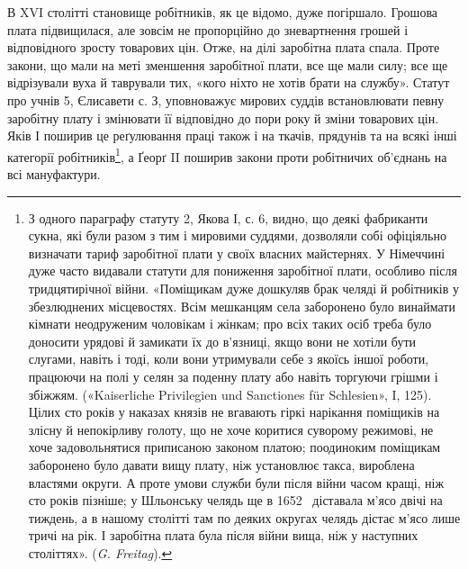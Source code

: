 В XVI столітті становище робітників, як це відомо, дуже
погіршало. Грошова плата підвищилася, але зовсім не пропорційно
до зневартнення грошей і відповідного зросту товарових цін.
Отже, на ділі заробітна плата спала. Проте закони, що мали на
меті зменшення заробітної плати, все ще мали силу; все ще відрізували
вуха й таврували тих, «кого ніхто не хотів брати на
службу». Статут про учнів 5, Єлисавети с. З, уповноважує мирових
суддів встановлювати певну заробітну плату і змінювати
її відповідно до пори року й зміни товарових цін. Яків І поширив
це реґулювання праці також і на ткачів, прядунів та на всякі
інші категорії робітників\footnote{
З одного параграфу статуту 2, Якова І, с. 6, видно, що деякі
фабриканти сукна, які були разом з тим і мировими суддями, дозволяли
собі офіціяльно визначати тариф заробітної плати у своїх власних майстернях.
У Німеччині дуже часто видавали статути для пониження
заробітної плати, особливо після тридцятирічної війни. «Поміщикам
дуже дошкуляв брак челяді й робітників у збезлюднених місцевостях.
Всім мешканцям села заборонено було винаймати кімнати неодруженим
чоловікам і жінкам; про всіх таких осіб треба було доносити урядові
й замикати їх до в’язниці, якщо вони не хотіли бути слугами, навіть
і тоді, коли вони утримували себе з якоїсь іншої роботи, працюючи на
полі у селян за поденну плату або навіть торгуючи грішми і збіжжям.
(«Kaiserliche Privilegien und Sanctiones für Schlesien», I, 125). Цілих
сто років у наказах князів не вгавають гіркі нарікання поміщиків на
злісну й непокірливу голоту, що не хоче коритися суворому режимові,
не хоче задовольнятися приписаною законом платою; поодиноким поміщикам
заборонено було давати вищу плату, ніж установлює такса, вироблена
властями округи. А проте умови служби були після війни
часом кращі, ніж сто років пізніше; у Шльонську челядь ще в 1652~
діставала м’ясо двічі на тиждень, а в нашому столітті там по деяких
округах челядь дістає м’ясо лише тричі на рік. І заробітна плата була
після війни вища, ніж у наступних століттях». (\emph{G. Freitag}).},
а Ґеорґ II поширив закони проти
робітничих об’єднань на всі мануфактури.

